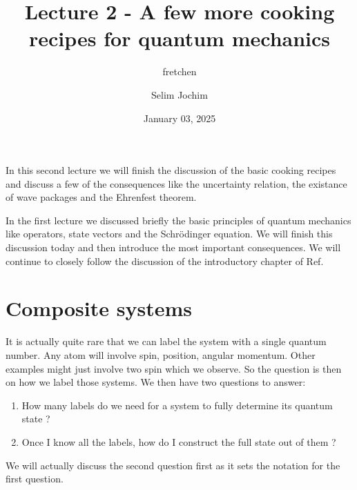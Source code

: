 \documentclass[10pt]{article}
\let\cite\citep
\renewenvironment{abstract}
  {{\bfseries\noindent{\abstractname}\par\nobreak}\footnotesize}
  {\bigskip}
\providecommand\citep{\cite}
\begin{document}
\title{Lecture 2 - A few more cooking recipes for quantum mechanics}



\author[1]{fretchen}%
\author[2]{Selim Jochim}%
%
%


\vspace{-1em}



  
  \date{January 03, 2025}


\begingroup
\let\center\flushleft
\let\endcenter\endflushleft
\maketitle
\endgroup





\begin{abstract}
In this second lecture we will finish the discussion of the basic cooking recipes and discuss a few of the consequences like the uncertainty relation, the existance of wave packages and the Ehrenfest theorem.%
\end{abstract}%



\sloppy


In the first lecture \cite{Jendrzejewski} we discussed briefly the basic principles of quantum mechanics like operators, state vectors and the Schrödinger equation. We will finish this discussion today and then introduce the most important consequences. We will continue to closely follow the discussion of the introductory chapter of Ref. \cite{2006}

\section{Composite systems}
It is actually quite rare that we can label the system with a single quantum number. Any atom will involve spin, position, angular momentum. Other examples might just involve two spin which we observe. So the question is then on how we label those systems. We then have two questions to answer:
\begin{enumerate}
\item How many labels do we need for a system to fully determine its quantum state ?
\item Once I know all the labels, how do I construct the full state out of them ?
\end{enumerate}
We will actually discuss the second question first as it sets the notation for the first question.
\end{document}

